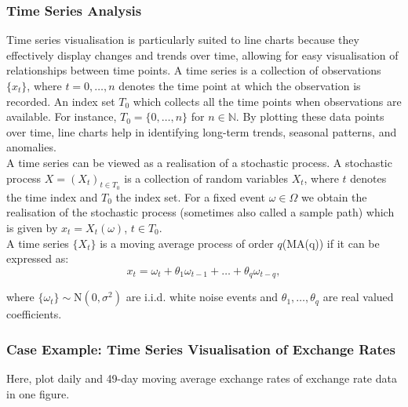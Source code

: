 \documentclass{article}\usepackage[]{graphicx}\usepackage[]{xcolor}
\numberwithin{equation}{section}
\begin{document}
\subsubsection{Time Series Analysis}

Time series visualisation is particularly suited to line charts because they effectively display changes and trends over time, allowing for easy visualisation of relationships between time points. A time series \cite{Brockwell2016Introduction} is a collection of observations $\{x_t\}$, where $t=0,\dots,n$ denotes the time point at which the observation is recorded. An index set $T_0$ which collects all the time points when observations are available. For instance, $T_0 = \{0,\dots,n\}$ for $n \in \mathbb{N}$. By plotting these data points over time, line charts help in identifying long-term trends, seasonal patterns, and anomalies.\\

\noindent
A time series can be viewed as a realisation of a stochastic process. A stochastic process \cite{Brockwell2016Introduction} $X = (X_t)_{t \in T_0}$ is a collection of random variables $X_t$, where $t$ denotes the time index and $T_0$ the index set. For a fixed event $\omega \in \Omega$ we obtain the realisation of the stochastic process (sometimes also called a sample path) which is given by $x_t = X_t(\omega)$, $t \in T_0$.\\

\noindent
A time series $\{X_t\}$ is a moving average process \cite{Brockwell2016Introduction} of order $q$(MA(q)) if it can be expressed as:
\[x_t = \omega_t + \theta_1 \omega_{t-1}+\dots+ \theta_q \omega_{t-q},\]

\noindent
where $\{\omega_t\} \sim \text{N}(0, \sigma^2)$ are i.i.d. white noise events and $\theta_1,\dots,\theta_q$ are real valued coefficients.

\subsubsection{Case Example: Time Series Visualisation of Exchange Rates}

Here, plot daily and 49-day moving average exchange rates of exchange rate data in one figure.
\end{document}
